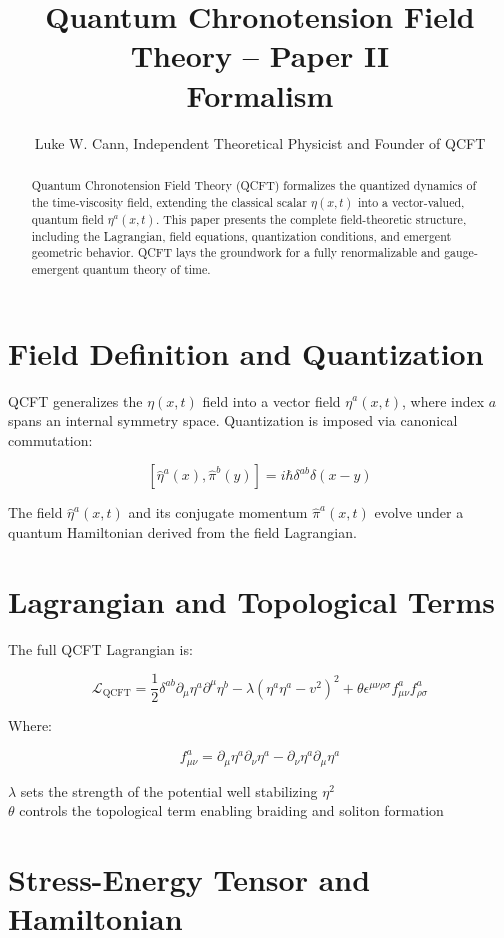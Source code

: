 \documentclass[12pt]{article}
\title{Quantum Chronotension Field Theory – Paper II\\\large Formalism}
\author{Luke W. Cann, Independent Theoretical Physicist and Founder of QCFT}
\date{}
\begin{document}
\maketitle

\begin{abstract}
Quantum Chronotension Field Theory (QCFT) formalizes the quantized dynamics of the time-viscosity field, extending the classical scalar $\eta(x,t)$ into a vector-valued, quantum field $\eta^a(x,t)$. This paper presents the complete field-theoretic structure, including the Lagrangian, field equations, quantization conditions, and emergent geometric behavior. QCFT lays the groundwork for a fully renormalizable and gauge-emergent quantum theory of time.
\end{abstract}

\section{Field Definition and Quantization}

QCFT generalizes the $\eta(x,t)$ field into a vector field $\eta^a(x,t)$, where index $a$ spans an internal symmetry space. Quantization is imposed via canonical commutation:

\[
[ \hat{\eta}^a(x), \hat{\pi}^b(y) ] = i\hbar \delta^{ab} \delta(x - y)
\]

The field $\hat{\eta}^a(x,t)$ and its conjugate momentum $\hat{\pi}^a(x,t)$ evolve under a quantum Hamiltonian derived from the field Lagrangian.

\section{Lagrangian and Topological Terms}

The full QCFT Lagrangian is:

\[
\mathcal{L}_{\text{QCFT}} = \frac{1}{2} \delta^{ab} \partial_\mu \eta^a \partial^\mu \eta^b - \lambda(\eta^a \eta^a - v^2)^2 + \theta \epsilon^{\mu\nu\rho\sigma} f_{\mu\nu}^a f_{\rho\sigma}^a
\]

Where:

\[
f_{\mu\nu}^a = \partial_\mu \eta^a \partial_\nu \eta^a - \partial_\nu \eta^a \partial_\mu \eta^a
\]

\noindent
$\lambda$ sets the strength of the potential well stabilizing $\eta^2$ \\
$\theta$ controls the topological term enabling braiding and soliton formation

\section{Stress-Energy Tensor and Hamiltonian}
\end{document}
